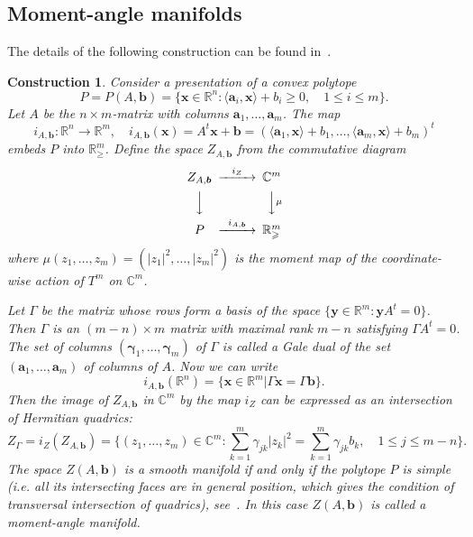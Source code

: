 \documentclass[jsg]{IP_v1_forauthors}
\def\geq{\geqslant}
\def\leq{\leqslant}
\newtheorem{cons}[theo]{Construction}
\theoremstyle{definition}
\numberwithin{equation}{section}
\begin{document}
\subsection{Moment-angle manifolds}
The details of the following construction can be found in~\cite[Construction 6.1.1]{BP}.
\begin{cons}
Consider a presentation of a convex polytope
\begin{equation}
P=P(A,\boldsymbol{b})=\{ \boldsymbol{x}  \in {\mathbb R}^n: \langle \boldsymbol{a}_i,\boldsymbol{x} \rangle + b_i \geq 0, \quad 1 \leq i \leq m   \}.
\end{equation}
Let $A$ be the $n\times m$-matrix with columns $\boldsymbol{a}_1,\dots,\boldsymbol{a}_m$.
The map
\begin{equation}
i_{A,\boldsymbol{b}}: {\mathbb R}^n \rightarrow {\mathbb R}^m, \quad i_{A,\boldsymbol{b}}(\boldsymbol{x})=A^t \boldsymbol{x} + \boldsymbol{b}=
(\langle \boldsymbol{a}_1,\boldsymbol{x} \rangle + b_1,\ldots,\langle \boldsymbol{a}_m,\boldsymbol{x} \rangle + b_m )^t 
\end{equation}
embeds $P$ into  ${\mathbb R}^m_{\geq}$. Define the space $Z_{A,\boldsymbol{b}}$ from the commutative diagram
\begin{equation}
\begin{CD}
Z_{A,\boldsymbol{b}}  @>i_{Z}>>                  {\mathbb C}^m \\
@VVV                                              @VV\mu V      \\
P               @>i_{A,\boldsymbol{b}}>>         {\mathbb R}^m_{\geq}
\end{CD}
\end{equation}
where $\mu(z_1,\ldots,z_m)=(|z_1|^2,\ldots,|z_m|^2)$ is the moment map of the coordinate-wise action of $T^m$ on ${\mathbb C}^m$.

Let $\Gamma$ be the matrix whose rows form a basis of the space $\{\boldsymbol{y} \in {\mathbb R}^m : \boldsymbol{y} A^t =0\}$. Then $\Gamma$
is an $(m-n)\times m$ matrix with maximal rank $m-n$ satisfying $\Gamma A^t=0$. The set of columns $(\boldsymbol{\gamma}_1,\ldots,\boldsymbol{\gamma}_m)$ of $\Gamma$ is called a Gale dual of the set $(\boldsymbol{a}_1,\ldots,\boldsymbol{a}_m)$ of columns of $A$. Now  we can write
\begin{equation}
i_{A,\boldsymbol{b}}({\mathbb R}^n)= \{ \boldsymbol{x} \in {\mathbb R}^m | \Gamma \boldsymbol{x}= \Gamma \boldsymbol{b} \}.
\end{equation}
Then the image of $Z_{A,\boldsymbol{b}}$ in ${\mathbb C}^m$ by the map $i_Z$ can be expressed as an intersection of Hermitian quadrics:
\begin{equation}
Z_\Gamma=i_Z (Z_{A,\boldsymbol{b}} )=\{(z_1,\dots,z_m) \in {\mathbb C}^m : \sum_{k=1}^m \gamma_{jk}|z_k|^2=\sum_{k=1}^m \gamma_{jk}b_k,  \quad 1\leq j \leq m-n \}.
\end{equation}
The space $Z(A,\boldsymbol{b})$ is a smooth manifold if and only if the polytope $P$ is simple (i.e. all its intersecting faces are in general position, which gives the condition of transversal intersection of quadrics), see~\cite[Theorem 6.1.3]{BP}. In this case $Z(A,\boldsymbol{b})$ is called a {\itshape moment-angle manifold}.
\end{cons}
\end{document}
